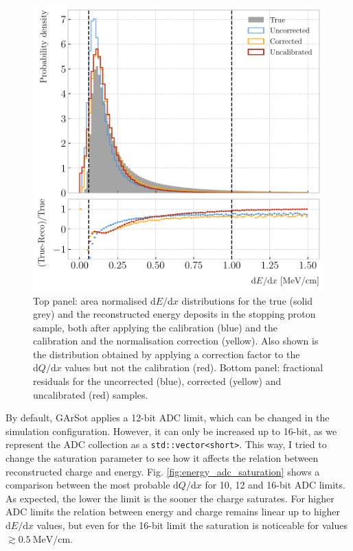 \begin{figure}[t]
	\centering
	\includegraphics[width=.80\linewidth]{Images/GArSoft_PID/dEdx/reco_dEdx_corrected_1d.pdf}
	\caption{Top panel: area normalised $\mathrm{d}E/\mathrm{d}x$ distributions for the true (solid grey) and the reconstructed energy deposits in the stopping proton sample, both after applying the calibration (blue) and the calibration and the normalisation correction (yellow). Also shown is the distribution obtained by applying a correction factor to the $\mathrm{d}Q/\mathrm{d}x$ values but not the calibration (red). Bottom panel: fractional residuals for the uncorrected (blue), corrected (yellow) and uncalibrated (red) samples.}
	\label{fig:energy_correction}
\end{figure}

By default, GArSot applies a 12-bit ADC limit, which can be changed in the simulation configuration. However, it can only be increased up to 16-bit, as we represent the ADC collection as a \texttt{std::vector<short>}. This way, I tried to change the saturation parameter to see how it affects the relation between reconstructed charge and energy. Fig. \ref{fig:energy_adc_saturation} shows a comparison between the most probable $\mathrm{d}Q/\mathrm{d}x$ for 10, 12 and 16-bit ADC limits. As expected, the lower the limit is the sooner the charge saturates. For higher ADC limits the relation between energy and charge remains linear up to higher $\mathrm{d}E/\mathrm{d}x$ values, but even for the 16-bit limit the saturation is noticeable for values $\gtrsim 0.5 ~ \mathrm{MeV}/\mathrm{cm}$.


